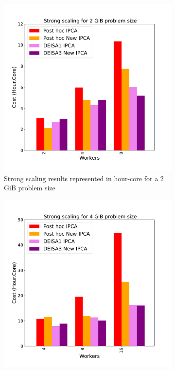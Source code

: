 \begin{figure}[h]
     \centering
     \begin{subfigure}[b]{0.4\textwidth}
         \centering
         \includegraphics[width=\textwidth, height=\textwidth]{figures/AD2_1vs3vspost1vspost2.pdf}
         \caption{Strong scaling results represented in hour-core for a 2\,GiB problem size}
         \label{fig:AD2}
     \end{subfigure}
     \hfill
     \begin{subfigure}[b]{0.4\textwidth}
         \centering
         \includegraphics[width=\textwidth, height=\textwidth]{figures/AD4_1vs3vspost1vspost2.pdf}

\end{subfigure}
\end{figure}
